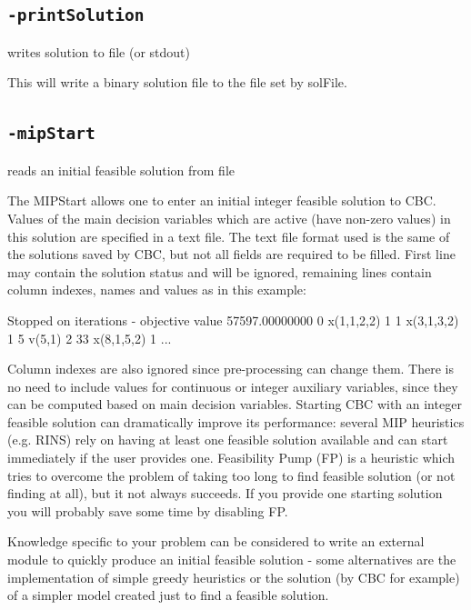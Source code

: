 \documentclass[11pt,a4paper]{article}
\begin{document}
\subsection*{\texttt{-printSolution}}

writes solution to file (or stdout)

This will write a binary solution file to the file set by solFile.

\subsection*{\texttt{-mipStart}}

reads an initial feasible solution from file

The MIPStart allows one to enter an initial integer feasible solution to CBC. Values of the main decision variables which are active (have non-zero values) in this solution are specified in a text  file. The text file format used is the same of the solutions saved by CBC, but not all fields are required to be filled. First line may contain the solution status and will be ignored, remaining lines contain column indexes, names and values as in this example:

 Stopped on iterations - objective value 57597.00000000
      0  x(1,1,2,2)               1 
      1  x(3,1,3,2)               1 
      5  v(5,1)                   2 
      33 x(8,1,5,2)               1 
      ...

 Column indexes are also ignored since pre-processing can change them. There is no need to include values for continuous or integer auxiliary variables, since they can be computed based on main decision variables. Starting CBC with an integer feasible solution can dramatically improve its performance: several MIP heuristics (e.g. RINS) rely on having at least one feasible solution available and can start immediately if the user provides one. Feasibility Pump (FP) is a heuristic which tries to overcome the problem of taking too long to find feasible solution (or not finding at all), but it not always succeeds. If you provide one starting solution you will probably save some time by disabling FP. 

 Knowledge specific to your problem can be considered to write an external module to quickly produce an initial feasible solution - some alternatives are the implementation of simple greedy heuristics or the solution (by CBC for example) of a simpler model created just to find a feasible solution. 
\end{document}
